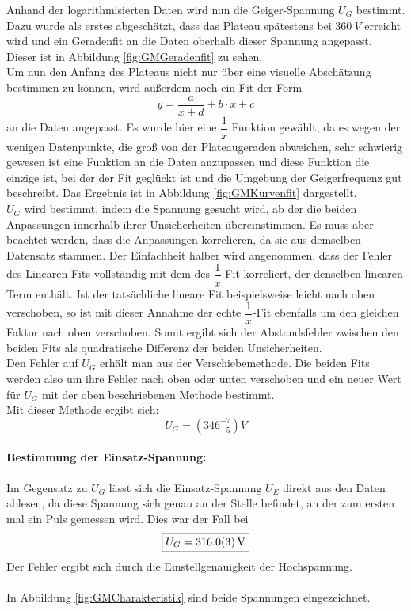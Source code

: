 \documentclass[12pt,a4paper]{article}
\begin{document}
Anhand der logarithmisierten Daten wird nun die Geiger-Spannung $U_G$ bestimmt. Dazu  wurde als erstes abgeschätzt, dass das Plateau spätestens bei $\SI{360}{V}$ erreicht wird und ein Geradenfit an die Daten oberhalb dieser Spannung angepasst. Dieser ist in Abbildung \ref{fig:GMGeradenfit} zu sehen.\\
Um nun den Anfang des Plateaus nicht nur über eine visuelle Abschätzung bestimmen zu können, wird außerdem noch ein Fit der Form
\begin{equation*}
y = \dfrac{a}{x+d} + b\cdot x + c
\end{equation*}
an die Daten angepasst. Es wurde hier eine $\dfrac{1}{x}$ Funktion gewählt, da es wegen der wenigen Datenpunkte, die groß von der Plateaugeraden abweichen, sehr schwierig gewesen ist eine Funktion an die Daten anzupassen und diese Funktion die einzige ist, bei der der Fit geglückt ist und die Umgebung der Geigerfrequenz gut beschreibt. Das Ergebnis ist in Abbildung \ref{fig:GMKurvenfit} dargestellt.\\
$U_G$ wird bestimmt, indem die Spannung gesucht wird, ab der die beiden Anpassungen innerhalb ihrer Unsicherheiten übereinstimmen. Es muss aber beachtet werden, dass die Anpassungen korrelieren, da sie aus demselben Datensatz stammen. Der Einfachheit halber wird angenommen, dass der Fehler des Linearen Fits vollständig mit dem des $\dfrac{1}{x}$-Fit korreliert, der denselben linearen Term enthält. Ist der tatsächliche lineare Fit beispielsweise leicht nach oben verschoben, so ist mit dieser Annahme der echte $\dfrac{1}{x}$-Fit ebenfalls um den gleichen Faktor nach oben verschoben. Somit ergibt sich der Abstandsfehler zwischen den beiden Fits als quadratische Differenz der beiden Unsicherheiten.\\
Den Fehler auf $U_G$ erhält man aus der Verschiebemethode. Die beiden Fits werden also um ihre Fehler nach oben oder unten verschoben und ein neuer Wert für $U_G$ mit der oben beschriebenen Methode bestimmt.\\
Mit dieser Methode ergibt sich:
\begin{equation*}
\boxed{U_G = (346_{-5}^{+7})\si{V}}
\end{equation*}
\paragraph{Bestimmung der Einsatz-Spannung:}
Im Gegensatz zu $U_G$ lässt sich die Einsatz-Spannung $U_E$ direkt aus den Daten ablesen, da diese Spannung sich genau an der Stelle befindet, an der zum ersten mal ein Puls gemessen wird. Dies war der Fall bei
\begin{equation*}
\boxed{U_G = \SI{316.0\pm 0.3}{V}}
\end{equation*}
Der Fehler ergibt sich durch die Einstellgenauigkeit der Hochspannung.\\
\\
In Abbildung \ref{fig:GMCharakteristik} sind beide Spannungen eingezeichnet.
\end{document}

